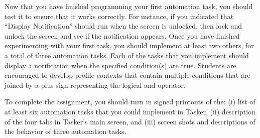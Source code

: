 Now that you have finished programming your first automation task, you should test it to ensure that it works correctly.
For instance, if you indicated that ``Display Notification'' should run when the screen is unlocked, then lock and
unlock the screen and see if the notification appears.  Once you have finished experimenting with your first task, you
should implement at least two others, for a total of three automation tasks. Each of the tasks that you implement should
display a notification when the specified condition(s) are true.  Students are encouraged to develop profile contexts that
contain multiple conditions that are joined by a plus sign representing the logical and operator. 


To complete the assignment, you should turn in signed printouts of the: (i) list of at least six automation tasks
that you could implement in Tasker, (ii) description of the four tabs in Tasker's main screen, and (iii) screen shots
and descriptions of the behavior of three automation tasks.


